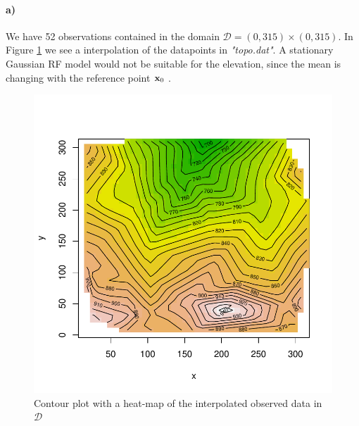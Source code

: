 \paragraph{a)}
We have 52 observations contained in the domain $\mathcal{D} = (0,315)\times(0,315)$. In Figure \ref{fig:terrain2a} we see a interpolation of the datapoints in \textit{"topo.dat"}. A stationary Gaussian RF model would not be suitable for the elevation, since the mean is changing with the reference point $\boldsymbol{\mathbf{x}}_0$ .

\begin{figure}[htb]
    \centering
    \includegraphics{figures/terrain2a.pdf}
    \caption{Contour plot with a heat-map of the interpolated observed data in $\mathcal{D}$}
    \label{fig:terrain2a}
\end{figure}


